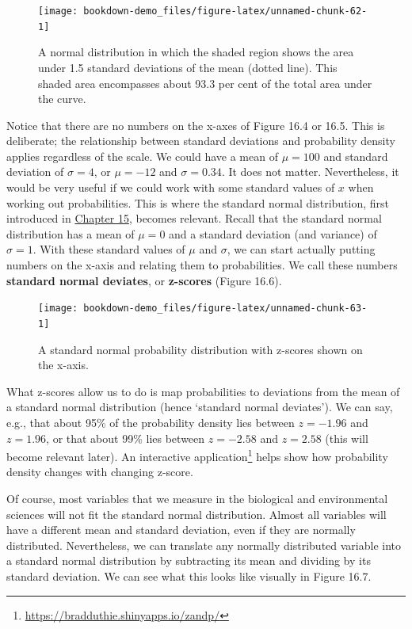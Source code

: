 \documentclass[
  openany]{krantz}
\begin{document}
\begin{figure}
\texttt{[image: bookdown-demo\_files/figure-latex/unnamed-chunk-62-1]} \caption{A normal distribution in which the shaded region shows the area under 1.5 standard deviations of the mean (dotted line). This shaded area encompasses about 93.3 per cent of the total area under the curve.}\label{fig:unnamed-chunk-62}
\end{figure}

Notice that there are no numbers on the x-axes of Figure 16.4 or 16.5.
This is deliberate; the relationship between standard deviations and probability density applies regardless of the scale.
We could have a mean of \(\mu = 100\) and standard deviation of \(\sigma = 4\), or \(\mu = -12\) and \(\sigma = 0.34\).
It does not matter.
Nevertheless, it would be very useful if we could work with some standard values of \(x\) when working out probabilities.
This is where the standard normal distribution, first introduced in \protect\hyperlink{Chapter_15}{Chapter 15}, becomes relevant.
Recall that the standard normal distribution has a mean of \(\mu = 0\) and a standard deviation (and variance) of \(\sigma = 1\).
With these standard values of \(\mu\) and \(\sigma\), we can start actually putting numbers on the x-axis and relating them to probabilities.
We call these numbers \textbf{standard normal deviates}, or \textbf{z-scores} (Figure 16.6).

\begin{figure}
\texttt{[image: bookdown-demo\_files/figure-latex/unnamed-chunk-63-1]} \caption{A standard normal probability distribution with z-scores shown on the x-axis.}\label{fig:unnamed-chunk-63}
\end{figure}

What z-scores allow us to do is map probabilities to deviations from the mean of a standard normal distribution (hence `standard normal deviates').
We can say, e.g., that about 95\% of the probability density lies between \(z = -1.96\) and \(z = 1.96\), or that about 99\% lies between \(z = -2.58\) and \(z = 2.58\) (this will become relevant later).
An interactive application\footnote{\url{https://bradduthie.shinyapps.io/zandp/}} helps show how probability density changes with changing z-score.

Of course, most variables that we measure in the biological and environmental sciences will not fit the standard normal distribution.
Almost all variables will have a different mean and standard deviation, even if they are normally distributed.
Nevertheless, we can translate any normally distributed variable into a standard normal distribution by subtracting its mean and dividing by its standard deviation.
We can see what this looks like visually in Figure 16.7.
\end{document}
